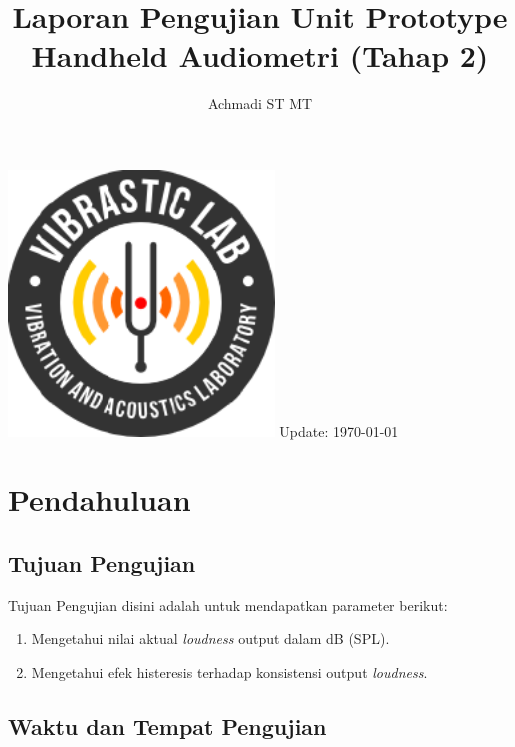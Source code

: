 \documentclass[12pt,]{article}
\title{\LARGE \bf
	Laporan Pengujian Unit Prototype Handheld Audiometri (Tahap 2)\\
}
\author{Achmadi ST MT}
\date{}
\begin{document}
	\thispagestyle{empty}

	\begin{titlepage}
		\centering
		\vfill
		\vfill
		\maketitle
		\vfill
		\includegraphics[width=200pt]{images/logo/logoviblab}
		\vfill
		\vfill
		Update: {\today} \currenttime \\
	\end{titlepage}


	\newpage
	\tableofcontents


	\newpage
	\section{Pendahuluan}

	\subsection{Tujuan Pengujian}

	Tujuan Pengujian disini adalah untuk mendapatkan parameter berikut:
	\begin{enumerate}
		\item Mengetahui nilai aktual \textit{loudness} output dalam dB (SPL).
		\item Mengetahui efek histeresis terhadap konsistensi output \textit{loudness}.
	\end{enumerate}

	\subsection{Waktu dan Tempat Pengujian}
\end{document}
